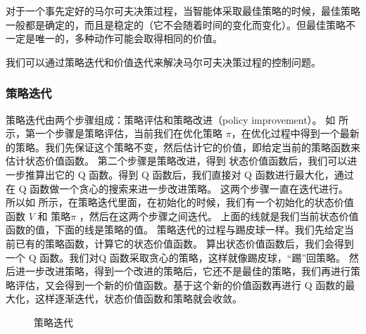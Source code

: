 对于一个事先定好的马尔可夫决策过程，当智能体采取最佳策略的时候，最佳策略一般都是确定的，而且是稳定的（它不会随着时间的变化而变化）。但最佳策略不一定是唯一的，多种动作可能会取得相同的价值。

我们可以通过策略迭代和价值迭代来解决马尔可夫决策过程的控制问题。

\subsubsection{策略迭代} 

策略迭代由两个步骤组成：策略评估和策略改进（policy improvement）。
如 所示，第一个步骤是策略评估，当前我们在优化策略 $\pi$，在优化过程中得到一个最新的策略。我们先保证这个策略不变，然后估计它的价值，即给定当前的策略函数来估计状态价值函数。
第二个步骤是策略改进，得到 状态价值函数后，我们可以进一步推算出它的 Q 函数。得到 Q 函数后，我们直接对 Q 函数进行最大化，通过在 Q 函数做一个贪心的搜索来进一步改进策略。
这两个步骤一直在迭代进行。
所以如 所示，在策略迭代里面，在初始化的时候，我们有一个初始化的状态价值函数 $V$ 和 策略$\pi$ ，然后在这两个步骤之间迭代。
 上面的线就是我们当前状态价值函数的值，下面的线是策略的值。
策略迭代的过程与踢皮球一样。我们先给定当前已有的策略函数，计算它的状态价值函数。
算出状态价值函数后，我们会得到一个 Q 函数。我们对Q 函数采取贪心的策略，这样就像踢皮球，“踢”回策略。
然后进一步改进策略，得到一个改进的策略后，它还不是最佳的策略，我们再进行策略评估，又会得到一个新的价值函数。基于这个新的价值函数再进行 Q 函数的最大化，这样逐渐迭代，状态价值函数和策略就会收敛。

\begin{figure}[hbt]
  \centering
  \caption{策略迭代}
  \label{fig:fig2.45}
\end{figure}

